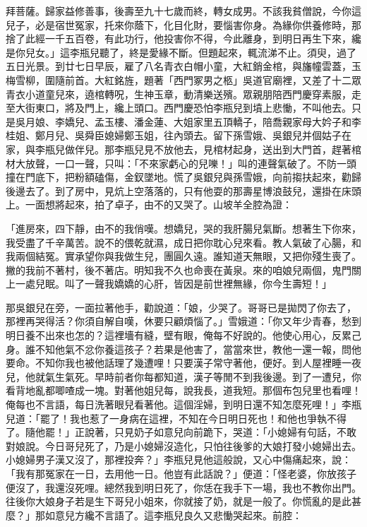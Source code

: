 拜菩薩。歸家益修善事，後壽至九十七歲而終，轉女成男。不該我貧僧說，今你這兒子，必是宿世冤家，托來你蔭下，化目化財，要惱害你身。為緣你供養修時，那捨了此經一千五百卷，有此功行，他投害你不得，今此離身，到明日再生下來，纔是你兒女。」這李瓶兒聽了，終是愛緣不斷。但題起來，輒流涕不止。須臾，過了五日光景。到廿七日早辰，雇了八名青衣白帽小童，大紅銷金棺，與旛幢雲蓋，玉梅雪柳，圍隨前首。大紅銘旌，題著「西門冢男之柩」吳道官廟裡，又差了十二眾青衣小道童兒來，遶棺轉呪，生神玉章，動清樂送殯。眾親朋陪西門慶穿素服，走至大街東口，將及門上，纔上頭口。西門慶恐怕李瓶兒到墳上悲慟，不叫他去。只是吳月娘、李嬌兒、孟玉樓、潘金蓮、大姐家里五頂轎子，陪喬親家母大妗子和李桂姐、鄭月兒、吳舜臣媳婦鄭玉姐，往內頭去。留下孫雪娥、吳銀兒并個姑子在家，與李瓶兒做伴兒。那李瓶兒見不放他去，見棺材起身，送出到大門首，趕著棺材大放聲，一口一聲，只叫：「不來家虧心的兒嚛！」叫的連聲氣破了。不防一頭撞在門底下，把粉額磕傷，金釵墜地。慌了吳銀兒與孫雪娥，向前搊扶起來，勸歸後邊去了。到了房中，見炕上空落落的，只有他耍的那壽星博浪鼓兒，還掛在床頭上。一面想將起來，拍了卓子，由不的又哭了。山坡羊全腔為證：

「進房來，四下靜，由不的我俏嘆。想嬌兒，哭的我肝腸兒氣斷。想著生下你來，我受盡了千辛萬苦。說不的偎乾就濕，成日把你耽心兒來看。教人氣破了心腸，和我兩個結冤。實承望你與我做生兒，團圓久遠。誰知道天無眼，又把你殘生喪了。撇的我前不著村，後不著店。明知我不久也命喪在黃泉。來的咱娘兒兩個，鬼門關上一處兒眠。叫了一聲我嬌嬌的心肝，皆因是前世裡無緣，你今生壽短！」

那吳銀兒在旁，一面拉著他手，勸說道：「娘，少哭了。哥哥已是拋閃了你去了，那裡再哭得活？你須自解自嘆，休要只顧煩惱了。」雪娥道：「你又年少青春，愁到明日養不出來也怎的？這裡墻有縫，壁有眼，俺每不好說的。他使心用心，反累己身。誰不知他氣不忿你養這孩子？若果是他害了，當當來世，教他一還一報，問他要命。不知你我也被他話理了幾遭哩！只要漢子常守著他，便好。到人屋裡睡一夜兒，他就氣生氣死。早時前者你每都知道，漢子等閒不到我後邊。到了一遭兒，你看背地亂都唧喳成一塊。對著他姐兒每，說我長，道我短。那個布包兒里也看哩！俺每也不言語，每日洗著眼兒看著他。這個淫婦，到明日還不知怎麼死哩！」李瓶兒道：「罷了！我也惹了一身病在這裡，不知在今日明日死也！和他也爭執不得了。隨他罷！」正說著，只見奶子如意兒向前跪下，哭道：「小媳婦有句話，不敢對娘說。今日哥兒死了，乃是小媳婦沒造化，只怕往後爹的大娘打發小媳婦出去。小媳婦男子漢又沒了，那裡投奔？」李瓶兒見他這般說，又心中傷痛起來，說：「我有那冤家在一日，去用他一日。他豈有此話說？」便道：「怪老婆，你放孩子便沒了，我還沒死哩。總然我到明日死了，你恁在我手下一場，我也不教你出門。往後你大娘身子若是生下哥兒小姐來，你就接了奶，就是一般了。你慌亂的是此甚麼？」那如意兒方纔不言語了。這李瓶兒良久又悲慟哭起來。前腔：

